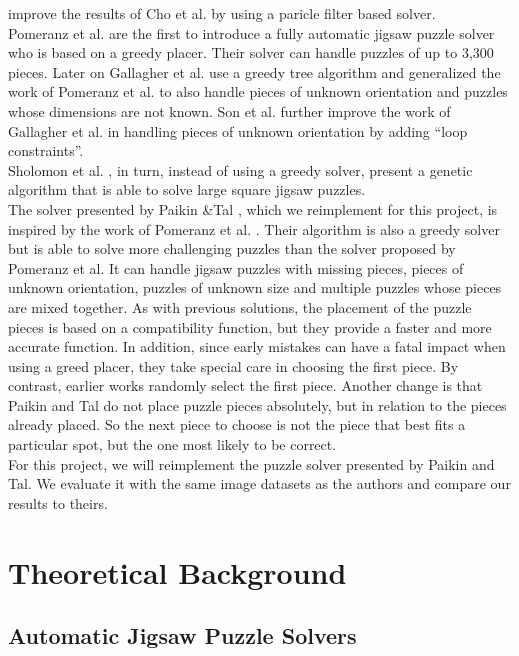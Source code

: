 \documentclass[]{report}
\begin{document}
\cite{yang2011particle} improve the results of Cho et al. by using a paricle filter
based solver. \\
Pomeranz et al. \cite{Pomeranz2011} are the first to introduce a fully
automatic jigsaw puzzle solver who is based on a greedy placer. Their solver
can handle puzzles of up to 3,300 pieces. Later on Gallagher et al.
\cite{gallagher2012jigsaw} use a greedy tree algorithm and generalized the work
of Pomeranz et al. to also handle pieces of unknown orientation and puzzles
whose dimensions are not known. Son et al. \cite{son2014solving} further
improve the work of Gallagher et al. in handling pieces of unknown orientation
by adding ``loop constraints''. \\
Sholomon et al. \cite{sholomon2013genetic}, in turn, instead of using a greedy
solver, present a genetic algorithm that is able to solve large square jigsaw
puzzles. \\
The solver presented by Paikin \&Tal \cite{Paikin2015}, which we reimplement for
this project, is inspired by the work of Pomeranz et al. \cite{Pomeranz2011}.
Their algorithm is also a greedy solver but is able to solve more challenging
puzzles than the solver proposed by Pomeranz et al. It can handle jigsaw puzzles with
missing pieces, pieces of unknown orientation, puzzles of unknown size and
multiple puzzles whose pieces are mixed together. As with previous solutions,
the placement of the puzzle pieces is based on a compatibility function, but
they provide a faster and more accurate function. In addition, since early
mistakes can have a fatal impact when using a greed placer, they take special
care in choosing the first piece. By contrast, earlier works randomly select the
first piece. Another change is that Paikin and Tal do not place puzzle pieces
absolutely, but in relation to the pieces already placed. So the next piece to
choose is not the piece that best fits a particular spot, but the one most
likely to be correct.\\
For this project, we will reimplement the puzzle solver presented by
Paikin and Tal. We evaluate it with the same image datasets as the authors and
compare our results to theirs.


\chapter{Theoretical Background}
\section{Automatic Jigsaw Puzzle Solvers}
\end{document}
